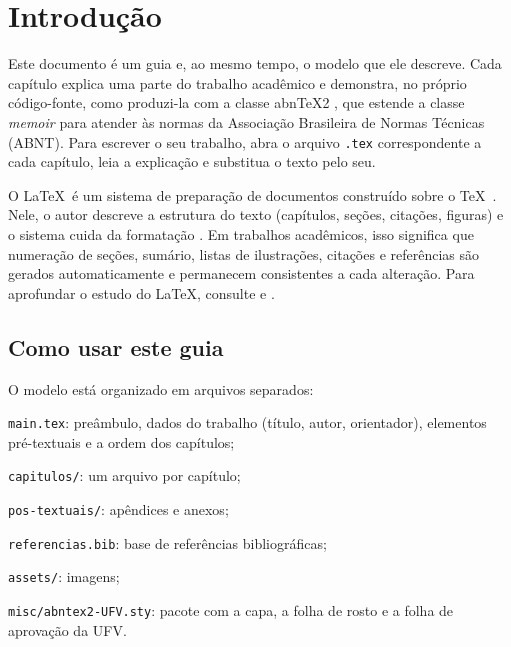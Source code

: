 \chapter{Introdução}\label{cap:introducao}

Este documento é um guia e, ao mesmo tempo, o modelo que ele descreve. Cada capítulo explica uma parte do trabalho acadêmico e demonstra, no próprio código-fonte, como produzi-la com a classe abn\TeX2 \cite{abntex2classe}, que estende a classe \textit{memoir} \cite{memoir} para atender às normas da Associação Brasileira de Normas Técnicas (ABNT). Para escrever o seu trabalho, abra o arquivo \texttt{.tex} correspondente a cada capítulo, leia a explicação e substitua o texto pelo seu.

O \LaTeX\ é um sistema de preparação de documentos construído sobre o \TeX\ \cite{knuth1984texbook}. Nele, o autor descreve a estrutura do texto (capítulos, seções, citações, figuras) e o sistema cuida da formatação \cite{lamport1994}. Em trabalhos acadêmicos, isso significa que numeração de seções, sumário, listas de ilustrações, citações e referências são gerados automaticamente e permanecem consistentes a cada alteração. Para aprofundar o estudo do \LaTeX, consulte  e .

\section{Como usar este guia}\label{sec:como-usar}

O modelo está organizado em arquivos separados:

\begin{alineas}
	\item \texttt{main.tex}: preâmbulo, dados do trabalho (título, autor, orientador), elementos pré-textuais e a ordem dos capítulos;
	\item \texttt{capitulos/}: um arquivo por capítulo;
	\item \texttt{pos-textuais/}: apêndices e anexos;
	\item \texttt{referencias.bib}: base de referências bibliográficas;
	\item \texttt{assets/}: imagens;
	\item \texttt{misc/abntex2-UFV.sty}: pacote com a capa, a folha de rosto e a folha de aprovação da UFV.
\end{alineas}

